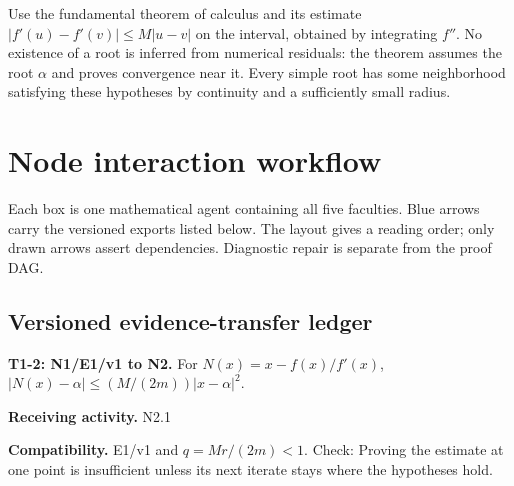 \documentclass[preprint,12pt,aps,pra,showkeys,amsmath,amssymb,superscriptaddress,floatfix]{revtex4-2}
\theoremstyle{definition}
\theoremstyle{remark}
\newcommand{\field}[2]{\par\smallskip\noindent\textbf{#1.} #2\par}
\begin{document}
Use the fundamental theorem of calculus and its estimate
\(|f'(u)-f'(v)|\le M|u-v|\) on the interval, obtained by integrating
\(f''\). No existence of a root is inferred from numerical residuals:
the theorem assumes the root \(\alpha\) and proves convergence near it.
Every simple root has some neighborhood satisfying these hypotheses by
continuity and a sufficiently small radius.

\clearpage\section{Node interaction workflow}

\begin{center}\end{center}

Each box is one mathematical agent containing all five faculties. Blue
arrows carry the versioned exports listed below. The layout gives a
reading order; only drawn arrows assert dependencies. Diagnostic repair
is separate from the proof DAG.

\subsection{Versioned evidence-transfer ledger}

\begingroup\small\linespread{1.05}\selectfont

\field{T1-2: N1/E1/v1 to N2}{For \(N(x)=x-f(x)/f'(x)\), \(|N(x)-\alpha|\le (M/(2m))|x-\alpha|^2\).}

\field{Receiving activity}{N2.1}

\field{Compatibility}{E1/v1 and \(q=Mr/(2m)<1\). Check: Proving the estimate at one point is
insufficient unless its next iterate stays where the hypotheses hold.}
\end{document}
